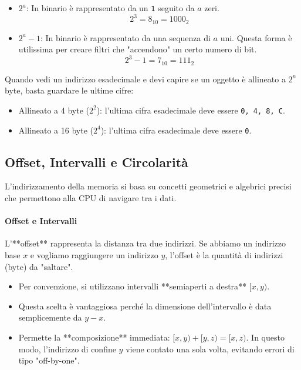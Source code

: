 \documentclass[a4paper,12pt]{article}
\begin{document}
	\begin{itemize}
		\item $2^a$: In binario è rappresentato da un \texttt{1} seguito da $a$ zeri.
		\[ 2^3 = 8_{10} = 1000_2 \]
		\item $2^a - 1$: In binario è rappresentato da una sequenza di $a$ uni. Questa forma è utilissima per creare filtri che "accendono" un certo numero di bit.
		\[ 2^3 - 1 = 7_{10} = 111_2 \]
	\end{itemize}
	
	\begin{tcolorbox}[colback=green!5!white,colframe=green!75!black,title=Barbatrucco]
		Quando vedi un indirizzo esadecimale e devi capire se un oggetto è allineato a $2^n$ byte, basta guardare le ultime cifre:
		\begin{itemize}
			\item Allineato a 4 byte ($2^2$): l'ultima cifra esadecimale deve essere \texttt{0, 4, 8, C}.
			\item Allineato a 16 byte ($2^4$): l'ultima cifra esadecimale deve essere \texttt{0}.
		\end{itemize}
	\end{tcolorbox}
	\subsection{Offset, Intervalli e Circolarità}
	
	L'indirizzamento della memoria si basa su concetti geometrici e algebrici precisi che permettono alla CPU di navigare tra i dati.
	
	\paragraph{Offset e Intervalli}
	L'**offset** rappresenta la distanza tra due indirizzi. Se abbiamo un indirizzo base $x$ e vogliamo raggiungere un indirizzo $y$, l'offset è la quantità di indirizzi (byte) da "saltare". 
	\begin{itemize}
		\item Per convenzione, si utilizzano intervalli **semiaperti a destra** $[x, y)$. 
		\item Questa scelta è vantaggiosa perché la dimensione dell'intervallo è data semplicemente da $y - x$.
		\item Permette la **composizione** immediata: $[x, y) + [y, z) = [x, z)$. In questo modo, l'indirizzo di confine $y$ viene contato una sola volta, evitando errori di tipo "off-by-one".
	\end{itemize}
	
\end{document}
